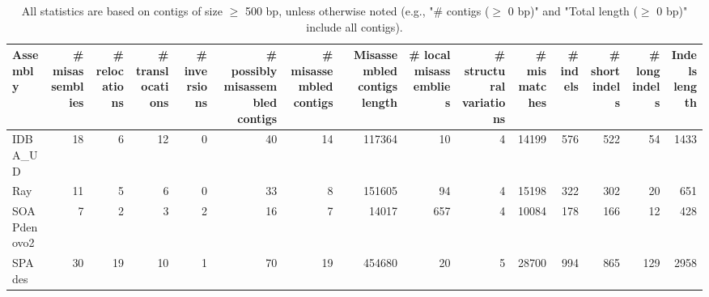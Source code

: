 \documentclass[12pt,a4paper]{article}
\begin{document}
\begin{table}[ht]
\begin{center}
\caption{All statistics are based on contigs of size $\geq$ 500 bp, unless otherwise noted (e.g., "\# contigs ($\geq$ 0 bp)" and "Total length ($\geq$ 0 bp)" include all contigs).}
\begin{tabular}{|l*{14}{|r}|}
\hline
Assembly & \# misassemblies &     \# relocations &     \# translocations &     \# inversions & \# possibly misassembled contigs & \# misassembled contigs & Misassembled contigs length & \# local misassemblies & \# structural variations & \# mismatches & \# indels &     \# short indels &     \# long indels & Indels length \\ \hline
IDBA\_UD & 18 & 6 & 12 & 0 & 40 & 14 & 117364 & 10 & 4 & 14199 & 576 & 522 & 54 & 1433 \\ \hline
Ray & 11 & 5 & 6 & 0 & 33 & 8 & 151605 & 94 & 4 & 15198 & 322 & 302 & 20 & 651 \\ \hline
SOAPdenovo2 & 7 & 2 & 3 & 2 & 16 & 7 & 14017 & 657 & 4 & 10084 & 178 & 166 & 12 & 428 \\ \hline
SPAdes & 30 & 19 & 10 & 1 & 70 & 19 & 454680 & 20 & 5 & 28700 & 994 & 865 & 129 & 2958 \\ \hline
\end{tabular}
\end{center}
\end{table}
\end{document}
